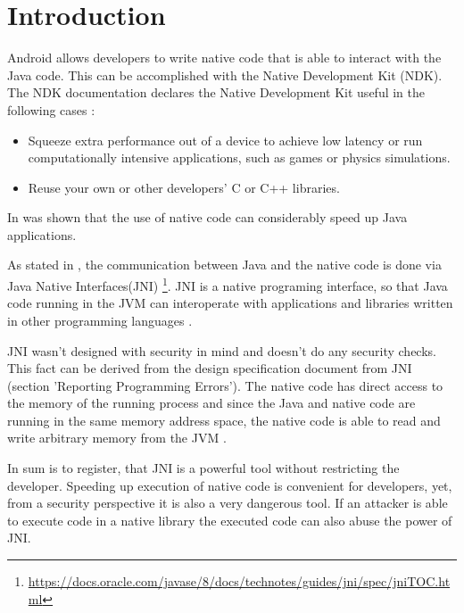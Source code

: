 \section{Introduction}

Android allows developers to write native code that is able to interact with the Java code. This can be accomplished with the Native Development Kit (NDK). The NDK documentation declares the Native Development Kit useful in the following cases \cite{AndroidNdkIntro}:

\begin{itemize}
	\item Squeeze extra performance out of a device to achieve low latency or run computationally intensive applications, such as games or physics simulations.
	\item Reuse your own or other developers' C or C++ libraries. 
\end{itemize}

In \cite{5669738} was shown that the use of native code can considerably speed up Java applications.

As stated in \cite{AndroidNdkIntro} , the communication between Java and the native code is done via Java Native Interfaces(JNI) \footnote{\url{https://docs.oracle.com/javase/8/docs/technotes/guides/jni/spec/jniTOC.html}}. 
JNI is a native programing interface, so that Java code running in the JVM can interoperate with applications and libraries written in other programming languages \cite{JNISpecChapter1}.

JNI wasn't designed with security in mind and doesn't do any security checks. This fact can be derived from the design specification document from JNI (section 'Reporting Programming Errors')\cite{JNISpecChapter2}.
The native code has direct access to the memory of the running process and
since the Java and native code are running in the same memory address space, the native code is able to read and write arbitrary memory from the JVM \cite[p. 2]{Afonso2016GoingNU}.

In sum is to register, that JNI is a powerful tool without
restricting the developer. Speeding up execution
of native code is convenient for developers, yet, from a security perspective it is also a very dangerous tool. If an attacker is able to execute code in a native library the executed code can also abuse the power of JNI.\\

